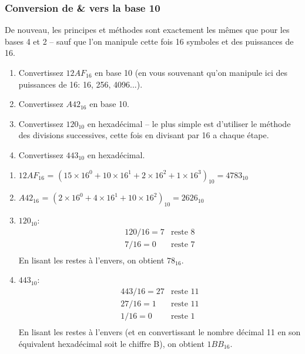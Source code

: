 \documentclass[12pt]{article}
\newenvironment{MaReponse}
		{\begin{greyedtextbox}\itshape} %
		{\end{greyedtextbox}}            %
\newenvironment{alphenum}
{\begin{enumerate}[label=\alph*.]}
	{\end{enumerate}}
\begin{document}
	 \subsubsection*{Conversion de \& vers la base 10}
	 De nouveau, les principes et méthodes sont exactement les mêmes que pour les bases 4 et 2 -- sauf que l'on manipule cette fois 16 symboles et des puissances de 16.
	 
	 \begin{MonExo}
	 	\begin{alphenum}
	 		\item Convertissez $12AF_{16}$ en base 10 (en vous souvenant qu'on manipule ici des puissances de 16: 16, 256, 4096...).
	 		\item Convertissez $A42_{16}$ en base 10.
	 		\item Convertissez $120_{10}$ en hexadécimal -- le plus simple est d'utiliser le méthode des divisions successives, cette fois en divisant par 16 a chaque étape.
	 		\item Convertissez $443_{10}$ en hexadécimal.
	 	\end{alphenum}
	 \end{MonExo}
	 \begin{MaReponse}
	 	\begin{alphenum}
	 		\item $12AF_{16}$ = $(15 \times 16^0 + 10 \times 16^1 + 2 \times 16^2 + 1 \times 16^3)_{10} = 4783_{10}$ %
	 		\item $A42_{16}$ = $(2 \times 16^0 + 4 \times 16^1 + 10 \times 16^2)_{10} = 2626_{10}$
	 		\item $120_{10}$:
	 		\[
	 		\begin{array}{ll}
	 			120/ 16 = 7 & \text{reste } 8 \\
	 			7 / 16 = 0 & \text{reste } 7 \\
	 		\end{array}
	 		\]
	 		En lisant les restes à l'envers, on obtient $78_{16}$.
	 		\item $443_{10}$:
	 		\[
	 		\begin{array}{ll}
	 			443/ 16 = 27 & \text{reste } 11 \\
	 			27 / 16 = 1 & \text{reste } 11 \\
	 			1 / 16 = 0 & \text{reste } 1 \\
	 		\end{array}
	 		\]
	 		En lisant les restes à l'envers (et en convertissant le nombre décimal 11 en son équivalent hexadécimal soit le chiffre B), on obtient $1BB_{16}$.
	 	\end{alphenum}
	 \end{MaReponse}
	 
\end{document}
